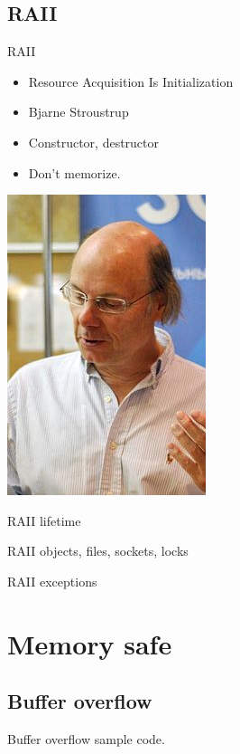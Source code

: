 \documentclass{beamer}
\begin{document}
\begin{CJK*}{UTF8}{bsmi}
    \subsection{RAII}
    \begin{frame}{RAII}
        \begin{itemize}
            \item Resource Acquisition Is Initialization
            \item Bjarne Stroustrup
            \item Constructor, destructor
            \item Don't memorize.
        \end{itemize}
        \includegraphics[height=.5\textheight]{Bjarne.jpg}
    \end{frame}

    \begin{frame}{RAII}
        lifetime
    \end{frame}

    \begin{frame}{RAII}
        objects, files, sockets, locks
    \end{frame}

    \begin{frame}{RAII}
        exceptions
    \end{frame}

    \section{Memory safe}
    \subsection{Buffer overflow}
    \begin{frame}{Buffer overflow}
        sample code.
    \end{frame}


\end{CJK*}
\end{document}

